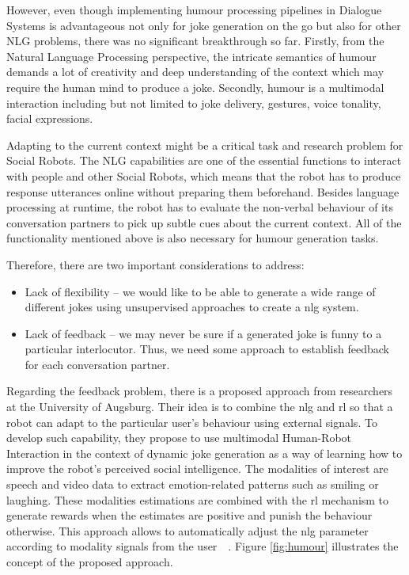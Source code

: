 However, even though implementing humour processing pipelines in Dialogue Systems is advantageous not only for joke generation on the go but also for other NLG problems, there was no significant breakthrough so far. Firstly, from the Natural Language Processing perspective, the intricate semantics of humour demands a lot of creativity and deep understanding of the context which may require the human mind to produce a joke.  Secondly, humour is a multimodal interaction including but not limited to joke delivery, gestures, voice tonality, facial expressions.  

Adapting to the current context might be a critical task and research problem for Social Robots. The NLG capabilities are one of the essential functions to interact with people and other Social Robots, which means that the robot has to produce response utterances online without preparing them beforehand. Besides language processing at runtime, the robot has to evaluate the non-verbal behaviour of its conversation partners to pick up subtle cues about the current context. All of the functionality mentioned above is also necessary for humour generation tasks. 

Therefore, there are two important considerations to address:
\begin{itemize}
    \item Lack of flexibility – we would like to be able to generate a wide range of different jokes using unsupervised approaches to create a \acrlong{nlg} system. 
    \item Lack of feedback – we may never be sure if a generated joke is funny to a particular interlocutor. Thus, we need some approach to establish feedback for each conversation partner. 
\end{itemize}

Regarding the feedback problem, there is a proposed approach from researchers at the University of Augsburg. Their idea is to combine the \acrshort{nlg} and \acrfull{rl} so that a robot can adapt to the particular user’s behaviour using external signals. To develop such capability, they propose to use multimodal Human-Robot Interaction in the context of dynamic joke generation as a way of learning how to improve the robot’s perceived social intelligence. The modalities of interest are speech and video data to extract emotion-related patterns such as smiling or laughing. These modalities estimations are combined with the \acrshort{rl} mechanism to generate rewards when the estimates are positive and punish the behaviour otherwise. This approach allows to automatically adjust the \acrshort{nlg} parameter according to modality signals from the user~\parencite{ritschel-andre-2018-shaping}~\parencite{10.1145/3242969.3242976}. Figure \ref{fig:humour} illustrates the concept of the proposed approach.

